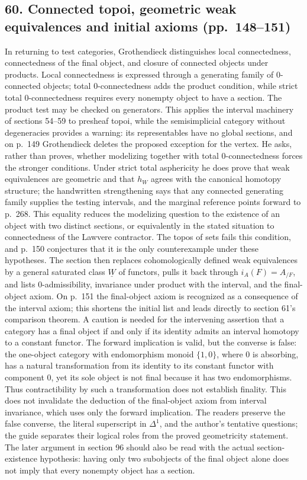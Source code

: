 \documentclass[10pt,oneside]{book}
\begin{document}
\subsection*{60. Connected topoi, geometric weak equivalences and initial axioms (pp.~148--151)}
In returning to test categories, Grothendieck distinguishes local connectedness, connectedness of the final object, and closure of connected objects under products. Local connectedness is expressed through a generating family of 0-connected objects; total 0-connectedness adds the product condition, while strict total 0-connectedness requires every nonempty object to have a section. The product test may be checked on generators. This applies the interval machinery of sections 54--59 to presheaf topoi, while the semisimplicial category without degeneracies provides a warning: its representables have no global sections, and on p.~149 Grothendieck deletes the proposed exception for the vertex. He asks, rather than proves, whether modelizing together with total 0-connectedness forces the stronger conditions. Under strict total asphericity he does prove that weak equivalences are geometric and that $h_W$ agrees with the canonical homotopy structure; the handwritten strengthening says that any connected generating family supplies the testing intervals, and the marginal reference points forward to p.~268. This equality reduces the modelizing question to the existence of an object with two distinct sections, or equivalently in the stated situation to connectedness of the Lawvere contractor. The topos of sets fails this condition, and p.~150 conjectures that it is the only counterexample under these hypotheses. The section then replaces cohomologically defined weak equivalences by a general saturated class $\underline W$ of functors, pulls it back through $i_A(F)=A_{/F}$, and lists 0-admissibility, invariance under product with the interval, and the final-object axiom. On p.~151 the final-object axiom is recognized as a consequence of the interval axiom; this shortens the initial list and leads directly to section 61's comparison theorem. A caution is needed for the intervening assertion that a category has a final object if and only if its identity admits an interval homotopy to a constant functor. The forward implication is valid, but the converse is false: the one-object category with endomorphism monoid $\{1,0\}$, where 0 is absorbing, has a natural transformation from its identity to its constant functor with component 0, yet its sole object is not final because it has two endomorphisms. Thus contractibility by such a transformation does not establish finality. This does not invalidate the deduction of the final-object axiom from interval invariance, which uses only the forward implication. The readers preserve the false converse, the literal superscript in $\Delta^1$, and the author's tentative questions; the guide separates their logical roles from the proved geometricity statement. The later argument in section 96 should also be read with the actual section-existence hypothesis: having only two subobjects of the final object alone does not imply that every nonempty object has a section.
\end{document}
